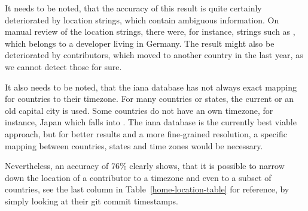 It needs to be noted, that the accuracy of this result is quite certainly deteriorated by location strings, which contain ambiguous information.
On manual review of the location strings, there were, for instance, strings such as , which belongs to a developer living in Germany.
The result might also be deteriorated by contributors, which moved to another country in the last year, as we cannot detect those for sure.

It also needs to be noted, that the \ac{iana} database has not always exact mapping for countries to their timezone.
For many countries or states, the current or an old capital city is used.
Some countries do not have an own timezone, for instance, Japan which falls into .
The \ac{iana} database is the currently best viable approach, but for better results and a more fine-grained resolution, a specific mapping between countries, states and time zones would be necessary.

Nevertheless, an accuracy of 76\% clearly shows, that it is possible to narrow down the location of a contributor to a timezone and even to a subset of countries, see the last column in Table~\ref{home-location-table} for reference, by simply looking at their git commit timestamps.

